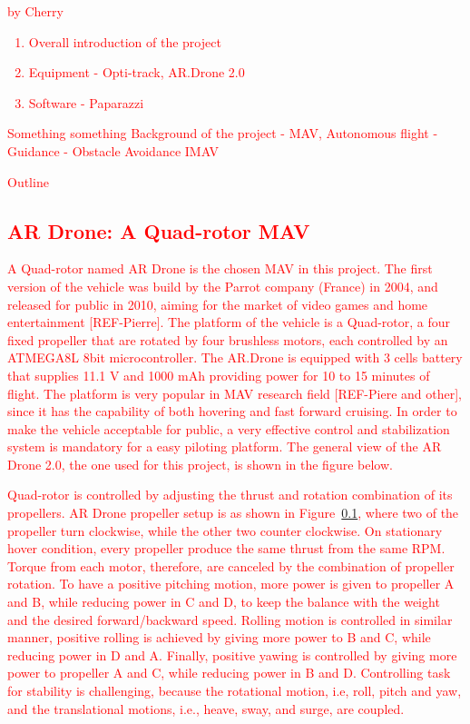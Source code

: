 \textcolor{red}{ 
by Cherry
\begin{enumerate}
	\item Overall introduction of the project
	\item Equipment - Opti-track, AR.Drone 2.0
	\item Software - Paparazzi
\end{enumerate}

Something something
Background of the project - MAV, Autonomous flight - Guidance - Obstacle Avoidance IMAV

Outline

\subsection{AR Drone: A Quad-rotor MAV}
A Quad-rotor named AR Drone is the chosen MAV in this project. The first version of the vehicle was build by the Parrot company (France) in 2004, and released for public in 2010, aiming for the market of video games and home entertainment [REF-Pierre]. The platform of the vehicle is a Quad-rotor, a four fixed propeller that are rotated by four brushless motors, each controlled by an ATMEGA8L 8bit microcontroller. The AR.Drone is equipped with 3 cells battery that supplies 11.1 V and 1000 mAh providing power for 10 to 15 minutes of flight. The platform is very popular in MAV research field [REF-Piere and other], since it has the capability of both hovering and fast forward cruising. In order to make the vehicle acceptable for public, a very effective control and stabilization system is mandatory for a easy piloting platform. The general view of the AR Drone 2.0, the one used for this project, is shown in the figure below.


Quad-rotor is controlled by adjusting the thrust and rotation combination of its propellers. AR Drone propeller setup is as shown in Figure~\ref{}, where two of the propeller turn clockwise, while the other two counter clockwise. On stationary hover condition, every propeller produce the same thrust from the same RPM. Torque from each motor, therefore, are canceled by the combination of propeller rotation. To have a positive pitching motion, more power is given to propeller A and B, while reducing power in C and D, to keep the balance with the weight and the desired forward/backward speed. Rolling motion is controlled in similar manner, positive rolling is achieved by giving more power to B and C, while reducing power in D and A. Finally, positive yawing is controlled by giving more power to propeller A and C, while reducing power in B and D. Controlling task for stability is challenging, because the rotational motion, i.e, roll, pitch and yaw, and the translational motions, i.e., heave, sway, and surge, are coupled.

}
